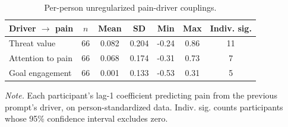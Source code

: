 \begin{table}[!htbp]
\raggedright
\caption{Per-person unregularized pain-driver couplings.}
\label{tab:sup-couplings}
\footnotesize
\begingroup
\setlength{\tabcolsep}{4pt}
\renewcommand{\arraystretch}{1.08}
\noindent
\begin{tabular*}{\textwidth}{@{\extracolsep{\fill}}lcccccc@{}}
\toprule
Driver $\rightarrow$ pain & $n$ & Mean & SD & Min & Max & Indiv. sig. \\
\midrule
Threat value & 66 & 0.082 & 0.204 & -0.24 & 0.86 & 11 \\
Attention to pain & 66 & 0.068 & 0.174 & -0.31 & 0.73 & 7 \\
Goal engagement & 66 & 0.001 & 0.133 & -0.53 & 0.31 & 5 \\
\bottomrule
\end{tabular*}
\par\vspace{3pt}\noindent\parbox{\textwidth}{\footnotesize\textit{Note.} Each participant's lag-1 coefficient predicting pain from the previous prompt's driver, on person-standardized data. Indiv. sig. counts participants whose 95\% confidence interval excludes zero.}
\endgroup
\end{table}
